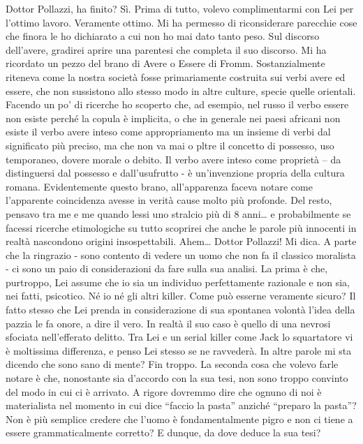 \documentclass[a4paper,12pt]{article}
\newcommand{\Walter}{\speak{W}}
\newcommand{\Pollazzi}{\speak{P}}
\begin{document}
\begin{dialogue}
\Walter  Dottor Pollazzi, ha finito?
\Pollazzi Sì.
\Walter  Prima di tutto, volevo complimentarmi con Lei per l’ottimo lavoro. Veramente ottimo. Mi ha permesso di riconsiderare parecchie cose che finora le ho dichiarato a cui non ho mai dato tanto peso. Sul discorso dell’avere, gradirei aprire una parentesi che completa il suo discorso. Mi ha ricordato un pezzo del brano di Avere o Essere di Fromm. Sostanzialmente riteneva come la nostra società fosse primariamente costruita sui verbi avere ed essere, che non sussistono allo stesso modo in altre culture, specie quelle orientali. Facendo un po’ di ricerche ho scoperto che, ad esempio, nel russo il verbo essere non esiste perché la copula è implicita, o che in generale nei paesi africani non esiste il verbo avere inteso come appropriamento ma un insieme di verbi dal significato più preciso, ma che non va mai o pltre il concetto di possesso, uso temporaneo, dovere morale o debito. Il verbo avere inteso come proprietà – da distinguersi dal possesso e dall’usufrutto - è un’invenzione propria della cultura romana. Evidentemente questo brano, all’apparenza faceva notare come l’apparente coincidenza avesse in verità cause molto più profonde. Del resto, pensavo tra me e me quando lessi uno stralcio più di 8 anni… e probabilmente se facessi ricerche etimologiche su tutto scoprirei che anche le parole più innocenti in realtà nascondono origini insospettabili.
\Walter  Ahem… Dottor Pollazzi!
\Pollazzi Mi dica.
\Walter  A parte che la ringrazio -  sono contento di vedere un uomo che non fa il classico moralista - ci sono un paio di considerazioni da fare sulla sua analisi. La prima è che, purtroppo, Lei assume che io sia un individuo perfettamente razionale e non sia, nei fatti, psicotico. Né io né gli altri killer. Come può esserne veramente sicuro?
\Pollazzi Il fatto stesso che Lei prenda in considerazione di sua spontanea volontà l’idea della pazzia le fa onore, a dire il vero. In realtà il suo caso è quello di una nevrosi sfociata nell’efferato delitto. Tra Lei e un serial killer come Jack lo squartatore vi è moltissima differenza, e penso Lei stesso se ne ravvederà.
\Walter  In altre parole mi sta dicendo che sono sano di mente?
\Pollazzi Fin troppo.
\Walter  La seconda cosa che volevo farle notare è che, nonostante sia d’accordo con la sua tesi, non sono troppo convinto del modo in cui ci è arrivato. A rigore dovremmo dire che ognuno di noi è materialista nel momento in cui dice “faccio la pasta” anziché “preparo la pasta”? Non è più semplice credere che l’uomo è fondamentalmente pigro e non ci tiene a essere grammaticalmente corretto? E dunque, da dove deduce la sua tesi?

\end{dialogue}
\end{document}
